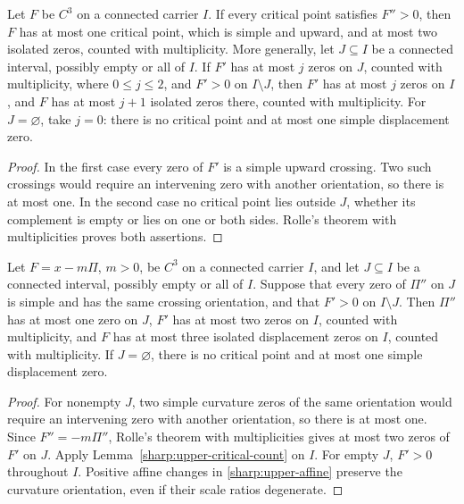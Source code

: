 \begin{lemma}\label{sharp:upper-critical-count}
Let \(F\) be \(C^3\) on a connected carrier \(I\). If every critical
point satisfies \(F''>0\), then \(F\) has at most one critical point,
which is simple and upward, and at most two isolated zeros, counted with
multiplicity. More generally, let \(J\subseteq I\) be a connected interval,
possibly empty or all of \(I\). If \(F'\) has at most \(j\)
zeros on \(J\), counted with multiplicity, where \(0\le j\le2\), and \(F'>0\) on
\(I\setminus J\), then \(F'\) has at most \(j\) zeros on \(I\), and
\(F\) has at most \(j+1\) isolated zeros there, counted with multiplicity.
For \(J=\varnothing\), take \(j=0\): there is no critical point and
at most one simple displacement zero.
\end{lemma}
\begin{proof}
In the first case every zero of \(F'\) is a simple upward crossing.
Two such crossings would require an intervening zero with another
orientation, so there is at most one. In the second case no critical
point lies outside \(J\), whether its complement is empty or lies on
one or both sides. Rolle's theorem with
multiplicities proves both assertions.
\end{proof}

\begin{lemma}\label{sharp:upper-curvature-count}
Let \(F=x-m\Pi\), \(m>0\), be \(C^3\) on a connected carrier \(I\),
and let \(J\subseteq I\) be a connected interval, possibly empty or
all of \(I\). Suppose that every zero of \(\Pi''\) on \(J\) is simple
and has the same crossing orientation, and that \(F'>0\) on
\(I\setminus J\). Then \(\Pi''\) has at most one zero on \(J\),
\(F'\) has at most two zeros on \(I\), counted with multiplicity,
and \(F\) has at most three
isolated displacement zeros on \(I\), counted with multiplicity.
If \(J=\varnothing\), there is no critical point and at most one
simple displacement zero.
\end{lemma}
\begin{proof}
For nonempty \(J\), two simple curvature zeros of the same orientation
would require an intervening zero with another orientation, so there is
at most one. Since \(F''=-m\Pi''\), Rolle's theorem with multiplicities
gives at most two zeros of \(F'\) on \(J\). Apply
Lemma~\ref{sharp:upper-critical-count} on \(I\). For empty \(J\),
\(F'>0\) throughout \(I\). Positive affine changes in
\eqref{sharp:upper-affine} preserve the curvature orientation, even if
their scale ratios degenerate.
\end{proof}

